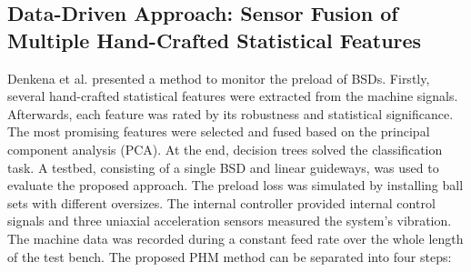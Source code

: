 \subsection{Data-Driven Approach: Sensor Fusion of Multiple Hand-Crafted Statistical Features}

Denkena et al. \cite{Denkena2021} presented a method to monitor the preload of BSDs. Firstly, several hand-crafted statistical features were extracted from the machine signals. Afterwards, each feature was rated by its robustness and statistical significance. The most promising features were selected and fused based on the principal component analysis (PCA). At the end, decision trees solved the classification task. A testbed, consisting of a single BSD and linear guideways, was used to evaluate the proposed approach. The preload loss was simulated by installing ball sets with different oversizes. The internal controller provided internal control signals and three uniaxial acceleration sensors measured the system's vibration. The machine data was recorded during a constant feed rate over the whole length of the test bench. The proposed PHM method can be separated into four steps:

